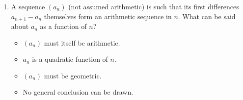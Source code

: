 \documentclass[11pt,a4paper]{article}
\begin{document}
\begin{enumerate}
\item A sequence $(a_n)$ (not assumed arithmetic) is such that its first differences $a_{n+1}-a_n$ themselves form an arithmetic sequence in $n$. What can be said about $a_n$ as a function of $n$?
\begin{itemize}
\item[A)] $(a_n)$ must itself be arithmetic.
\item[B)] $a_n$ is a quadratic function of $n$.
\item[C)] $(a_n)$ must be geometric.
\item[D)] No general conclusion can be drawn.
\end{itemize}

\end{enumerate}

\end{document}
